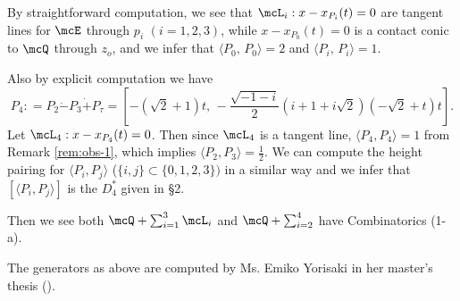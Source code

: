 \begin{exmple}[{\bf Combinatorics 1}]
\begin{itemize}

\end{itemize}
 By straightforward 
 computation, we see that $\mcL_i: x - x_{P_i}(t) = 0$ are tangent lines for $\mcE$ through $p_i$ $(i = 1, 2, 3)$, while
 $x - x_{P_0}(t) = 0$ is a contact conic to $\mcQ$ through $z_o$,  and we infer that
 $\langle P_0, \, P_0 \rangle = 2$ and $\langle P_i , \, P_i \rangle = 1$. 
 

 
 
 Also by explicit computation we have
 \[
 P_4: = P_2 \dot{-}P_3 \dot{+} P_{\tau} =
 \left [ -(\sqrt {2}+1)t, \, -\frac{\sqrt{-1-i}}{2} (i +1 +  {i}\sqrt{2})(-\sqrt{2}+t)t \right ].
 \]
  Let $\mcL_4: x - x_{P_4}(t) = 0$. Then since $\mcL_4$ is a tangent line, $\langle P_4, P_4\rangle=1$ from Remark \ref{rem:obs-1}, which implies $\langle P_2, P_3\rangle=\frac{1}{2}$. We can compute the height pairing for $ \langle P_i, P_j\rangle$ ($\{i,j\}\subset \{0,1,2,3\})$ in a similar way
 and we infer that $[\langle P_i, P_j \rangle ]$ is the $D_4^*$ given in \S 2. 
 
 
 Then we see both $\mcQ + \sum_{i=1}^3\mcL_i$ and
$\mcQ + \sum_{i=2}^4$ have Combinatorics (1-a).

\medskip

 \begin{rem} {\rm The generators as above are computed by Ms. Emiko Yorisaki in her master's thesis 
 (\cite{yorisaki}).
} 
 \end{rem}



\end{exmple}
